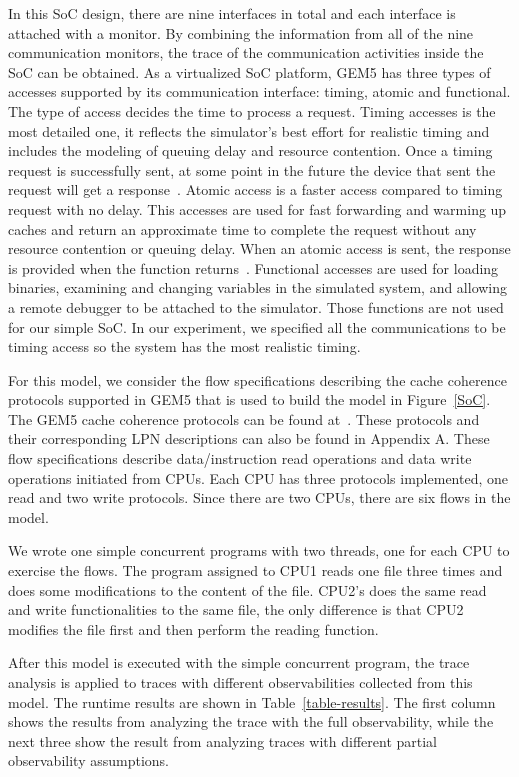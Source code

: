\documentclass[12pt,frontmatter,copyright,thesis]{usfmanus}
\begin{document}
In this SoC design, there are nine interfaces in total and each 
interface is attached with a monitor.
 By combining the information from all of the nine communication monitors, 
 the trace of the communication activities inside the SoC
 can be obtained.
As a virtualized SoC platform, GEM5 has three types of accesses supported by
its communication interface:
timing, atomic and functional.
The type of access decides the time
to process a request.
Timing accesses is the most detailed one,
it reflects the simulator's best effort for realistic timing
and includes the modeling of queuing delay and resource contention.
Once a timing request is successfully sent,
at some point in the future the device that sent the request will get a response~\cite{gem5}. 
Atomic access is a faster access compared to timing request with no delay.  
This accesses are used for fast forwarding and warming up caches and return an approximate time to complete the request without any resource contention or queuing delay.
When an atomic access is sent,
the response is provided when the function returns~\cite{gem5}.
Functional accesses are used for loading binaries, examining and changing variables in the simulated system,
and allowing a remote debugger to be attached to the simulator.
Those functions are not used for
our simple SoC.
In our experiment, we specified all the communications to be timing access
so the system has 
the most realistic timing.


For this model, we consider the flow specifications
describing the cache coherence protocols supported in
GEM5 that is used to build the model in Figure~\ref{SoC}.
The GEM5 cache coherence protocols can be found at~\cite{gem5}.
These protocols and their corresponding LPN descriptions can also be found
in Appendix A.
These flow specifications describe data/instruction read
operations and data write operations initiated from CPUs.
Each CPU has three protocols implemented, one read and two write protocols.
Since there are two CPUs, there are six flows in
the model.



We wrote one simple concurrent programs with two threads, one for each CPU
to exercise the flows.
The program assigned to CPU1 reads one file three times and does some modifications to
the content of the file. 
CPU2's does the same read and write functionalities to the same file,
the only difference is that CPU2 modifies the file first and then
perform the reading function. 

After this model is executed with the simple concurrent program, 
the trace analysis is applied to traces with different observabilities
collected from this model.  The runtime results are shown in Table~\ref{table-results}.
The first column shows the results from analyzing the trace with the full
observability, while the next three show the result from 
analyzing traces with different partial observability assumptions.
\end{document}
